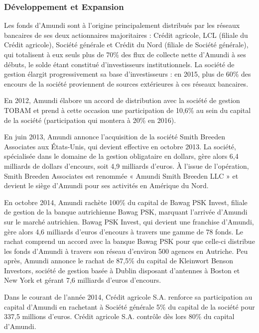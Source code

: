 \subsubsection{Développement et Expansion}
\par Les fonds d'Amundi sont à l'origine principalement distribués par les réseaux bancaires de ses deux actionnaires majoritaires : Crédit agricole, LCL (filiale du Crédit agricole), Société générale et Crédit du Nord (filiale de Société générale), qui totalisent à eux seuls plus de 70\% des flux de collecte nette d'Amundi à ses débuts, le solde étant constitué d'investisseurs institutionnels. La société de gestion élargit progressivement sa base d'investisseurs : en 2015, plus de 60\% des encours de la société proviennent de sources extérieures à ces réseaux bancaires.
\par En 2012, Amundi élabore un accord de distribution avec la société de gestion TOBAM et prend à cette occasion une participation de 10,6\% au sein du capital de la société (participation qui montera à 20\% en 2016).
\par En juin 2013, Amundi annonce l'acquisition de la société Smith Breeden Associates aux États-Unis, qui devient effective en octobre 2013. La société, spécialisée dans le domaine de la gestion obligataire en dollars, gère alors 6,4 milliards de dollars d'encours, soit 4,9 milliards d'euros. À l'issue de l'opération, Smith Breeden Associates est renommée « Amundi Smith Breeden LLC » et devient le siège d'Amundi pour ses activités en Amérique du Nord.
\par En octobre 2014, Amundi rachète 100\% du capital de Bawag PSK Invest, filiale de gestion de la banque autrichienne Bawag PSK, marquant l'arrivée d'Amundi sur le marché autrichien. Bawag PSK Invest, qui devient une franchise d'Amundi, gère alors 4,6 milliards d'euros d'encours à travers une gamme de 78 fonds. Le rachat comprend un accord avec la banque Bawag PSK pour que celle-ci distribue les fonds d'Amundi à travers son réseau d'environ 500 agences en Autriche. Peu après, Amundi annonce le rachat de 87,5\% du capital de Kleinwort Benson Investors, société de gestion basée à Dublin disposant d'antennes à Boston et New York et gérant 7,6 milliards d'euros d'encours.
\par Dans le courant de l'année 2014, Crédit agricole S.A. renforce sa participation au capital d'Amundi en rachetant à Société générale 5\% du capital de la société pour 337,5 millions d'euros. Crédit agricole S.A. contrôle dès lors 80\% du capital d'Amundi.

